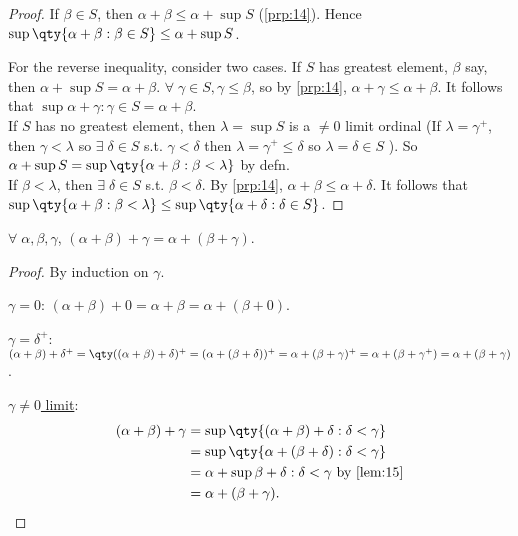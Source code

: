 \begin{proof}
    If $\beta \in S$, then $\alpha + \beta \leq \alpha + \sup S$ (\cref{prp:14}).
    Hence $\sup \qty{\alpha + \beta : \beta \in S} \leq \alpha + \sup S$.

    For the reverse inequality, consider two cases.
    If $S$ has greatest element, $\beta$ say, then $\alpha + \sup S = \alpha + \beta$.
    $\forall \; \gamma \in S, \gamma \leq \beta$, so by \cref{prp:14}, $\alpha + \gamma \leq \alpha + \beta$.
    It follows that $\sup{\alpha + \gamma : \gamma \in S} = \alpha + \beta$. \\
    If $S$ has no greatest element, then $\lambda = \sup S$ is a $\neq 0$ limit ordinal (If $\lambda = \gamma^+$, then $\gamma < \lambda$ so $\exists \; \delta \in S$ s.t. $\gamma < \delta$ then $\lambda = \gamma^+ \leq \delta$ so $\lambda = \delta \in S$ \Lightning).
    So $\alpha + \sup S = \sup \qty{\alpha + \beta : \beta < \lambda}$ by defn. \\
    If $\beta < \lambda$, then $\exists \; \delta \in S$ s.t. $\beta < \delta$.
    By \cref{prp:14}, $\alpha + \beta \leq \alpha + \delta$.
    It follows that $\sup \qty{\alpha + \beta : \beta < \lambda} \leq \sup \qty{\alpha + \delta : \delta \in S}$.
\end{proof}

\begin{proposition}
    $\forall \; \alpha, \beta, \gamma$, $(\alpha + \beta) + \gamma = \alpha + (\beta + \gamma)$.
\end{proposition}

\begin{proof}
    By induction on $\gamma$.

    \underline{$\gamma = 0$}: $(\alpha + \beta) + 0 = \alpha + \beta = \alpha + (\beta + 0)$.

    \underline{$\gamma = \delta^+$}: $(\alpha + \beta) + \delta^+ = \qty((\alpha + \beta) + \delta)^+ = (\alpha + (\beta + \delta))^+ = \alpha + (\beta + \gamma)^+ = \alpha + (\beta + \gamma^+) = \alpha + (\beta + \gamma)$.

    \underline{$\gamma \neq 0$ limit}:
    \begin{align*}
        (\alpha + \beta) + \gamma &= \sup \qty{(\alpha + \beta) + \delta : \delta < \gamma} \\
        &= \sup \qty{\alpha + (\beta + \delta) : \delta < \gamma} \\
        &= \alpha + \sup{\beta + \delta : \delta < \gamma} \text{ by \cref{lem:15}} \\
        &= \alpha + (\beta + \gamma).
    \end{align*}
\end{proof}

